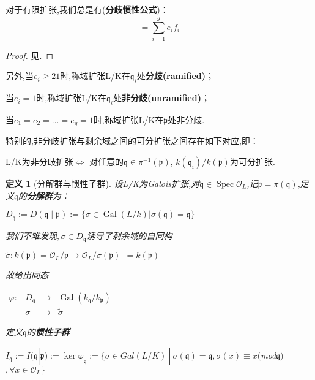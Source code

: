 \documentclass[11pt]{ctexart}
\DeclareMathOperator{\Spec}{Spec}
\DeclareMathOperator{\Gal}{Gal}
\newtheorem{defi}{定义}[section]
\begin{document}
对于有限扩张,我们总是有(\textbf{分歧惯性公式})：
\begin{equation}
    [L:K]=\sum_{i=1}^g e_if_i
\end{equation}
\begin{proof}
    见\cite{ant}.
\end{proof}

\noindent 另外,当$e_i \geqslant 2 1$时,称域扩张L/K在$\mathfrak{q}_i$处\textbf{分歧(ramified)}；

当$e_i = 1$时,称域扩张L/K在$\mathfrak{q}_i$处\textbf{非分歧(unramified)}；

当$e_1 =e_2=...=e_g =1$时,称域扩张L/K在$\mathfrak{p}$处非分歧.

\noindent 特别的,非分歧扩张与剩余域之间的可分扩张之间存在如下对应,即：
\begin{center}
    L/K为非分歧扩张$\Leftrightarrow $ 对任意的$\mathfrak{q}\in \pi^{-1}(\mathfrak{p})$, $k(\mathfrak{q}_i)/k(\mathfrak{p})$为可分扩张.
\end{center}

\begin{defi}[分解群与惯性子群]
    设L/K为Galois扩张,对$\mathfrak{q}\in \Spec \mathcal{O}_L$,记$\mathfrak{p}=\pi(\mathfrak{q})$,定义$\mathfrak{q}$的\textbf{分解群}为：
\begin{center}
    $D_\mathfrak{q}:=D(\mathfrak{q}\mid\mathfrak{p}):=\{\sigma \in \Gal(L/k)|\sigma(\mathfrak{q})=\mathfrak{q}\}$
\end{center}

\noindent 我们不难发现$,\sigma \in D_{\mathfrak{q}}$诱导了剩余域的自同构

\begin{center}
    $\widetilde{\sigma}: k(\mathfrak{p}) = \mathcal{O}_L/\mathfrak{p}\rightarrow \mathcal{O}_L/\sigma(\mathfrak{p})~~=k(\mathfrak{p})$
\end{center}

\noindent 故给出同态

\begin{center}
    $\begin{array}{cclc}
    \varphi: &D_{\mathfrak{q}}&\longrightarrow &\Gal(k_{\mathfrak{q}}/k_{\mathfrak{p}})\\
    
              &\sigma&\longmapsto &\widetilde{\sigma}
      \end{array}$
\end{center}

\noindent 定义$\mathfrak{q}$的\textbf{惯性子群}
\begin{center}
    $I_{\mathfrak{q}}:=I(\mathfrak{q}|\mathfrak{p}):= \ker\varphi _{\mathfrak{q}}:=\{\sigma \in Gal(L/K)~|~ \sigma(\mathfrak{q})=\mathfrak{q},\sigma(x)\equiv x($\textup{mod}$\mathfrak{q})$$,\forall x \in \mathcal{O}_L\}$
\end{center}
\end{defi}
\end{document}
